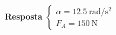 \textbf{Resposta}
$
\begin{cases}
	\alpha=\SI{12.5}{\radian/\second^{2}}\\
	F_{A}=\SI{150}{\newton}
\end{cases}
$